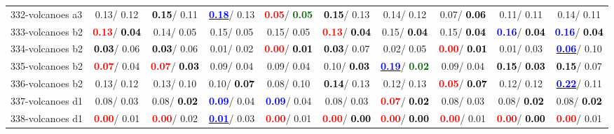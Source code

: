 \begin{table}[h]
\begin{center}
{\begin{tabular}{lc|c|c|c|c|c|c|c|c}
332-volcanoes a3 &   0.13/  0.12 & \textcolor{black}{\textbf{  0.15}}/  0.11 & \underline{\textcolor{blue}{\textbf{  0.18}}}/  0.13 & \textcolor{red}{\textbf{  0.05}}/\textcolor{darkgreen}{\textbf{  0.05}} & \textcolor{black}{\textbf{  0.15}}/  0.13 &   0.14/  0.12 &   0.07/\textcolor{black}{\textbf{  0.06}} &   0.11/  0.11 &   0.14/  0.11 \\
333-volcanoes b2 & \textcolor{red}{\textbf{  0.13}}/\textcolor{black}{\textbf{  0.04}} &   0.14/  0.05 &   0.15/  0.05 &   0.15/  0.05 & \textcolor{red}{\textbf{  0.13}}/\textcolor{black}{\textbf{  0.04}} &   0.15/\textcolor{black}{\textbf{  0.04}} &   0.15/\textcolor{black}{\textbf{  0.04}} & \textcolor{blue}{\textbf{  0.16}}/\textcolor{black}{\textbf{  0.04}} & \textcolor{blue}{\textbf{  0.16}}/\textcolor{black}{\textbf{  0.04}} \\
334-volcanoes b2 & \textcolor{black}{\textbf{  0.03}}/  0.06 & \textcolor{black}{\textbf{  0.03}}/  0.06 &   0.01/  0.02 & \textcolor{red}{\textbf{  0.00}}/\textcolor{black}{\textbf{  0.01}} & \textcolor{black}{\textbf{  0.03}}/  0.07 &   0.02/  0.05 & \textcolor{red}{\textbf{  0.00}}/\textcolor{black}{\textbf{  0.01}} &   0.01/  0.03 & \underline{\textcolor{blue}{\textbf{  0.06}}}/  0.10 \\ \hline
335-volcanoes b2 & \textcolor{red}{\textbf{  0.07}}/  0.04 & \textcolor{red}{\textbf{  0.07}}/\textcolor{black}{\textbf{  0.03}} &   0.09/  0.04 &   0.09/  0.04 &   0.10/\textcolor{black}{\textbf{  0.03}} & \underline{\textcolor{blue}{\textbf{  0.19}}}/\textcolor{darkgreen}{\textbf{  0.02}} &   0.09/  0.04 & \textcolor{black}{\textbf{  0.15}}/\textcolor{black}{\textbf{  0.03}} & \textcolor{black}{\textbf{  0.15}}/  0.07 \\
336-volcanoes b2 &   0.13/  0.12 &   0.13/  0.10 &   0.10/\textcolor{black}{\textbf{  0.07}} &   0.08/  0.10 & \textcolor{black}{\textbf{  0.14}}/  0.13 &   0.12/  0.13 & \textcolor{red}{\textbf{  0.05}}/\textcolor{black}{\textbf{  0.07}} &   0.12/  0.12 & \underline{\textcolor{blue}{\textbf{  0.22}}}/  0.11 \\
337-volcanoes d1 &   0.08/  0.03 &   0.08/\textcolor{black}{\textbf{  0.02}} & \textcolor{blue}{\textbf{  0.09}}/  0.04 & \textcolor{blue}{\textbf{  0.09}}/  0.04 &   0.08/  0.03 & \textcolor{red}{\textbf{  0.07}}/\textcolor{black}{\textbf{  0.02}} &   0.08/  0.03 &   0.08/\textcolor{black}{\textbf{  0.02}} &   0.08/\textcolor{black}{\textbf{  0.02}} \\
338-volcanoes d1 & \textcolor{red}{\textbf{  0.00}}/  0.01 & \textcolor{red}{\textbf{  0.00}}/  0.02 & \underline{\textcolor{blue}{\textbf{  0.01}}}/  0.03 & \textcolor{red}{\textbf{  0.00}}/  0.01 & \textcolor{red}{\textbf{  0.00}}/\textcolor{black}{\textbf{  0.00}} & \textcolor{red}{\textbf{  0.00}}/\textcolor{black}{\textbf{  0.00}} & \textcolor{red}{\textbf{  0.00}}/  0.01 & \textcolor{red}{\textbf{  0.00}}/\textcolor{black}{\textbf{  0.00}} & \textcolor{red}{\textbf{  0.00}}/  0.01 \\

\end{tabular}}
\end{center}
\end{table}

